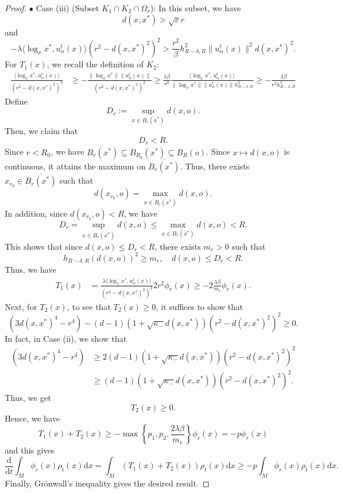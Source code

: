 \documentclass[10pt,a4paper]{amsart}
\def\d{\mathrm{d}}
\newcommand{\kp}{\kappa}
\begin{document}
\begin{proof}
 

\noindent $\bullet$ Case (iii) (Subset $K_1 \cap K_2 \cap \Omega_r$): In this subset, we have
\[
d(x,x^*)>\sqrt cr
\]
and
\[
-\lambda \langle \log_xx^*,u_\alpha^t(x)\rangle (r^2 - d(x,x^*)^2)^2 > \frac{r^2}{\beta} h_{R-\delta,R}^2\|u_\alpha^t(x)\|^2 d(x,x^*)^2 .
\]
For $T_1(x)$, we recall the definition of $K_2$:
\begin{align*}
 \frac{   \langle \log_xx^*,u_\alpha^t(x)\rangle }{  (r^2- d(x,x^*)^2)^2 }  &\geq -\frac{ \| \log_xx^* \| \| u_\alpha^t(x) \|  }{  (r^2- d(x,x^*)^2)^2  } \geq  \frac{\lambda \beta}{r^2} \frac{  \langle \log_xx^*, u_\alpha^t(x)\rangle}{ \|\log_xx^*\| \|u_\alpha^t(x)\| h_{R-\delta,R}^2} \geq -\frac{\lambda \beta}{r^2 h_{R-\delta,R}^2}
\end{align*} 
Define
\[
D_r:= \sup_{x\in B_r(x^*)} d(x,o).
\]
Then, we claim that 
\[
D_r <R.
\]
Since $r<R_0$, we have $\overline{B_r(x^*)} \subseteq B_{R_0}(x^*) \subseteq B_R(o)$. Since $x\mapsto d(x,o)$ is continuous, it attains the maximum on $\overline{B_r(x^*)}$. Thus, there exists $x_{r_0} \in \overline{B_r(x^*)}$ such that
\[
d(x_{r_0},o) = \max_{x\in \overline{B_r(x^*)}} d(x,o).
\]
In addition, since $d(x_{r_0},o)<R$, we have
\[
D_r = \sup_{x\in \overline{B_r(x^*)}} d(x,o) \leq \max_{x\in \overline{B_r(x^*)}} d(x,o)  <R.
\]
This shows that since $d(x,o)\leq D_r<R$,  there exists $m_r>0$ such that 
\begin{equation} \label{mr}
h_{R-\delta,R}(d(x,o))^2 \geq m_r,\quad d(x,o)\leq D_r<R.
\end{equation}
Thus, we have
\begin{align*}
T_1(x)& =  \frac{ \lambda \langle \log_xx^*,u_\alpha^t(x)\rangle }{  (r^2- d(x,x^*)^2)^2 } 2r^2\phi_r(x)  \geq -2\frac{\lambda \beta}{m_r} \phi_r(x).
\end{align*}
Next, for $T_2(x)$, to see that $T_2(x)\geq0$, it suffices to show that
\[
 (3d(x,x^*)^4-r^4  )  -(d-1)(1+\sqrt{\kp_-}d(x,x^*)) (r^2 - d(x,x^*)^2)^2  \geq0 .
 \]
 In fact, in Case (ii), we show that
 \begin{align*}
 (3d(x,x^*)^4-r^4  ) &\geq 2(d-1)(1+\sqrt{\kappa_-}d(x,x^*) )(r^2 - d(x,x^*)^2)^2  \\
 &\geq (d-1)(1+\sqrt{\kappa_-}d(x,x^*)) (r^2 - d(x,x^*)^2)^2.
 \end{align*}
Thus, we get
\[
T_2(x)\geq0.
\]
Hence, we have
\[
T_1(x) + T_2(x) \geq -\max\left\{ p_1,p_2, \frac{2\lambda \beta}{m_r}\right\} \phi_r(x) =-p\phi_r(x)
\]
and this gives
\[
\frac{\d}{\d t} \int_M \phi_r(x) \rho_t(x) \d x  = \int_M (T_1(x) + T_2(x) ) \rho_t(x) \d x  \geq -p\int_M  \phi_r(x) \rho_t(x) \d x.
\]
Finally, Gr\"onwall's inequality gives the desired result. 
\end{proof}
\end{document}
